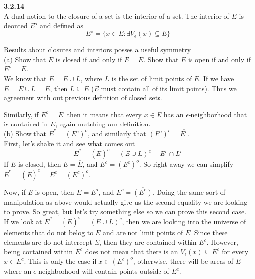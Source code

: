 \textbf{3.2.14}
\\

A dual notion to the closure of a set is the interior of a set.
The interior of $E$ is deonted $E^o$ and defined as
$$
E^o = \{ x\in E : \exists V_\epsilon (x) \subseteq E \}
$$

Results about closures and interiors posses a useful symmetry.
\\

(a) Show that $E$ is closed if and only if $\overline{E} = E$.
Show that $E$ is open if and only if $E^o = E$.
\\

We know that $\overline{E} = E \cup L$, where $L$ is the set of limit points of $E$.
If we have $\overline{E} = E \cup L = E$, then $L \subseteq E$ ($E$ must contain all of its limit points).
Thus we agreement with out previous defintion of closed sets.

Similarly, if $E^o = E$, then it means that every $x\in E$ has an $\epsilon$-neighborhood that is contained
in $E$, again matching our definition.
\\


(b) Show that $\overline{E}^c = (E^c)^o$, and similarly that $(E^o)^c = \overline{E^c}$.
\\

First, let's shake it and see what comes out
$$
\overline{E}^c = (\overline{E})^c = (E \cup L)^c = E^c \cap L^c
$$
If $E$ is closed, then $E=\overline{E}$, and $E^c = (E^c)^o$.
So right away we can simplify $\overline{E}^c = (\overline{E})^c = E^c = (E^c)^o$.

Now, if $E$ is open, then $E = E^o$, and $E^c = \overline{(E^c)}$.
Doing the same sort of manipulation as above would actually give us the second equality we are looking to prove.
So great, but let's try something else so we can prove this second case.
If we look at $\overline{E}^c = (\overline{E})^c = (E \cup L)^c$, then we are looking into the universe of elements
that do not belog to $E$ and are not limit points of $E$.
Since these elements are do not intercept $E$, then they are contained within $E^c$.
However, being contained within $E^c$ does not mean that there is an $V_\epsilon (x) \subseteq E^c$
for every $x\in E^c$.
This is only the case if $x\in (E^c)^o$, otherwise, there will be areas of $E$ where an $\epsilon$-neighborhood
will contain points outside of $E^c$.
\\~\\



